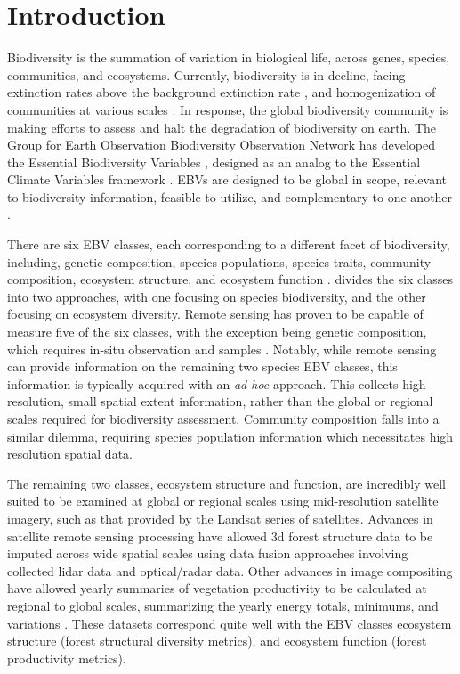 \documentclass[
  authoryear,
  review,
  3p,
  twocolumn]{elsarticle}
\begin{document}
\hypertarget{introduction}{%
\section{Introduction}\label{introduction}}

Biodiversity is the summation of variation in biological life, across
genes, species, communities, and ecosystems. Currently, biodiversity is
in decline, facing extinction rates above the background extinction rate
\citep{thomas2004, urban2015}, and homogenization of communities at
various scales \citep{mcgill2015}. In response, the global biodiversity
community is making efforts to assess and halt the degradation of
biodiversity on earth. The Group for Earth Observation Biodiversity
Observation Network has developed the Essential Biodiversity Variables
\citep[EBVs,][]{pereira2013}, designed as an analog to the Essential
Climate Variables framework \citep{bojinski2014}. EBVs are designed to
be global in scope, relevant to biodiversity information, feasible to
utilize, and complementary to one another \citep{skidmore2021}.

There are six EBV classes, each corresponding to a different facet of
biodiversity, including, genetic composition, species populations,
species traits, community composition, ecosystem structure, and
ecosystem function \citep{pereira2013}. \citet{fernández2020} divides
the six classes into two approaches, with one focusing on species
biodiversity, and the other focusing on ecosystem diversity. Remote
sensing has proven to be capable of measure five of the six classes,
with the exception being genetic composition, which requires in-situ
observation and samples \citep{skidmore2021}. Notably, while remote
sensing can provide information on the remaining two species EBV
classes, this information is typically acquired with an \emph{ad-hoc}
approach. This collects high resolution, small spatial extent
information, rather than the global or regional scales required for
biodiversity assessment. Community composition falls into a similar
dilemma, requiring species population information which necessitates
high resolution spatial data.

The remaining two classes, ecosystem structure and function, are
incredibly well suited to be examined at global or regional scales using
mid-resolution satellite imagery, such as that provided by the Landsat
series of satellites. Advances in satellite remote sensing processing
have allowed 3d forest structure data to be imputed across wide spatial
scales \citep{matasci2018, coops2021} using data fusion approaches
involving collected lidar data and optical/radar data. Other advances in
image compositing have allowed yearly summaries of vegetation
productivity to be calculated at regional to global scales, summarizing
the yearly energy totals, minimums, and variations \citep{radeloff2019}.
These datasets correspond quite well with the EBV classes ecosystem
structure (forest structural diversity metrics), and ecosystem function
(forest productivity metrics).
\end{document}
